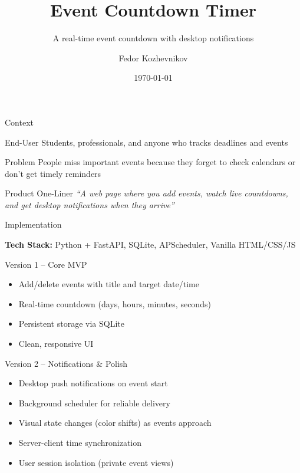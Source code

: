 \documentclass[aspectratio=169]{beamer}
\title[Event Countdown Timer]{Event Countdown Timer}
\subtitle{A real-time event countdown with desktop notifications}
\author{Fedor Kozhevnikov}
\institute[Uni]{Innopolis University \\ \texttt{f.kozhevnikov@innopolis.university} \\ Group: CSE-04}
\date{\today}
\begin{document}
\begin{frame}
    \titlepage
\end{frame}

\begin{frame}{Context}
    \begin{block}{End-User}
        Students, professionals, and anyone who tracks deadlines and events
    \end{block}

    \begin{block}{Problem}
        People miss important events because they forget to check calendars or don't get timely reminders
    \end{block}

    \begin{block}{Product One-Liner}
        \centering
        \textit{``A web page where you add events, watch live countdowns, and get desktop notifications when they arrive''}
    \end{block}
\end{frame}

\begin{frame}{Implementation}
    \small
    \setlength{\itemsep}{0pt}
    \setlength{\parskip}{0pt}

    \textbf{Tech Stack:} Python + FastAPI, SQLite, APScheduler, Vanilla HTML/CSS/JS

    \vspace{0.1cm}

    \begin{block}{Version 1 -- Core MVP}
        \begin{itemize}
            \item Add/delete events with title and target date/time
            \item Real-time countdown (days, hours, minutes, seconds)
            \item Persistent storage via SQLite
            \item Clean, responsive UI
        \end{itemize}
    \end{block}

    \begin{block}{Version 2 -- Notifications \& Polish}
        \begin{itemize}
            \item Desktop push notifications on event start
            \item Background scheduler for reliable delivery
            \item Visual state changes (color shifts) as events approach
            \item Server-client time synchronization
            \item User session isolation (private event views)
        \end{itemize}
    \end{block}
\end{frame}
\end{document}
